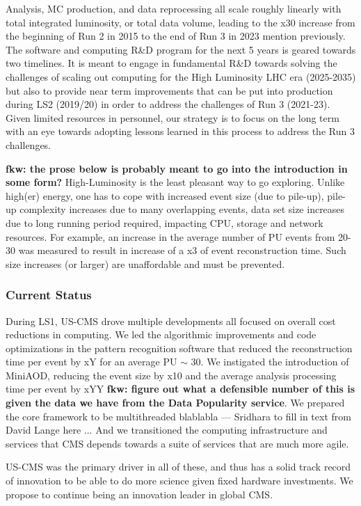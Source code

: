 \documentclass[11pt,a4paper]{article}
\begin{document}
Analysis, MC production, and data reprocessing all scale roughly linearly with total integrated luminosity, or total
data volume, leading to the x30 increase from the beginning of Run 2 in 2015 to the end of Run 3 in 2023 mention previously. 
The software and computing R\&D program for the next 5 years is geared towards two timelines. It is meant to
engage in fundamental R\&D towards solving the challenges of scaling out computing for the High Luminosity LHC era
(2025-2035) but also to provide near term improvements that can be put into production during LS2 (2019/20)
in order to address the challenges of Run 3 (2021-23). Given limited resources in personnel, our strategy is to focus
on the long term with an eye towards adopting lessons learned in this process to address the Run 3 challenges.

{\bf fkw: the prose below is probably meant to go into the introduction in some form?} 
High-Luminosity is the least
pleasant way to go exploring. Unlike high(er) energy, one has to cope
with increased event size (due to pile-up), pile-up complexity
increases due to many overlapping events, data set size increases due
to long running period required, impacting CPU, storage and network
resources.  For example, an increase in the average number of PU events from 20-30
was measured to result in increase of a x3 of event reconstruction
time. Such size increases (or larger) are unaffordable and must be
prevented.

\subsubsection{Current Status}

During LS1, US-CMS drove multiple developments all focused on overall cost reductions in computing.
We led the algorithmic improvements and code optimizations in the pattern recognition software that reduced the reconstruction
time per event by xY for an average PU $\sim$ 30. We instigated the introduction of MiniAOD, reducing the event size by x10
and the average analysis processing time per event by xYY {\bf fkw: figure out what a defensible number of this is given the data we have
from the Data Popularity service}. 
We prepared the core framework to be multithreaded blablabla --- Sridhara to fill in text from David Lange here ... 
And we transitioned the computing infrastructure and services that CMS depends towards a suite of services that are much more agile.

US-CMS was the primary driver in all of these, and thus has a solid track record of innovation to be able to do more science
given fixed hardware investments. We propose to continue being an innovation leader in global CMS. 
\end{document}
